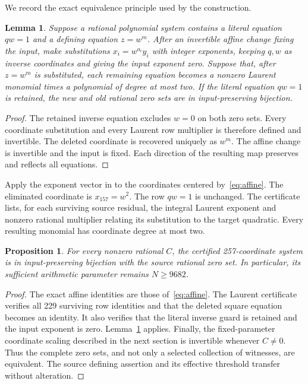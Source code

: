 \documentclass[11pt,a4paper]{article}
\newtheorem{lemma}[theorem]{Lemma}
\newtheorem{proposition}[theorem]{Proposition}
\begin{document}
We record the exact equivalence principle used by the construction.

\begin{lemma}\label{lem:laurent}
Suppose a rational polynomial system contains a literal equation
$qw=1$ and a defining equation $z=w^m$. After an invertible affine
change fixing the input, make substitutions
$x_i=w^{a_i}y_i$ with integer exponents, keeping $q,w$ as inverse
coordinates and giving the input exponent zero. Suppose that, after
$z=w^m$ is substituted, each remaining equation becomes a nonzero
Laurent monomial times a polynomial of degree at most two. If the
literal equation $qw=1$ is retained, the new and old rational zero
sets are in input-preserving bijection.
\end{lemma}

\begin{proof}
The retained inverse equation excludes $w=0$ on both zero sets.
Every coordinate substitution and every Laurent row multiplier is
therefore defined and invertible. The deleted coordinate is recovered
uniquely as $w^m$. The affine change is invertible and the input is
fixed. Each direction of the resulting map preserves and reflects
all equations.
\end{proof}

Apply the exponent vector in  to the
coordinates centered by~\eqref{eq:affine}. The eliminated coordinate
is $x_{157}=w^2$. The row $qw=1$ is unchanged. The certificate lists,
for each surviving source residual, the integral Laurent exponent and
nonzero rational multiplier relating its substitution to the target
quadratic. Every resulting monomial has coordinate degree at most two.

\begin{proposition}\label{prop:projection}
For every nonzero rational $C$, the certified 257-coordinate system
is in input-preserving bijection with the source rational zero set.
In particular, its sufficient arithmetic parameter remains
$N\ge9682$.
\end{proposition}

\begin{proof}
The exact affine identities are those of~\eqref{eq:affine}. The
Laurent certificate verifies all 229 surviving row identities and
that the deleted square equation becomes an identity. It also
verifies that the literal inverse guard is retained and the input
exponent is zero. Lemma~\ref{lem:laurent} applies. Finally, the
fixed-parameter coordinate scaling described in the next section
is invertible whenever $C\ne0$. Thus the complete zero sets,
and not only a selected collection of witnesses, are equivalent.
The source defining assertion and its effective threshold transfer
without alteration.
\end{proof}
\end{document}
